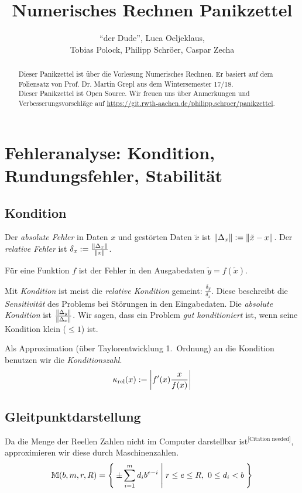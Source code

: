 \documentclass[a4paper,parskip=half*,DIV=15,fontsize=11pt]{scrartcl}
\title{Numerisches Rechnen Panikzettel}
\author{``der Dude'', Luca Oeljeklaus,\\ Tobias Polock, Philipp Schröer, Caspar Zecha}
\DeclarePairedDelimiter\abs{\lvert}{\rvert}
\DeclarePairedDelimiter\norm{\lVert}{\rVert}
\begin{document}
\maketitle

\begin{abstract}
Dieser Panikzettel ist über die Vorlesung Numerisches Rechnen. Er basiert auf dem Foliensatz von Prof. Dr. Martin Grepl aus dem Wintersemester 17/18.	\\
Dieser Panikzettel ist Open Source. Wir freuen uns über Anmerkungen und Verbesserungsvorschläge auf \url{https://git.rwth-aachen.de/philipp.schroer/panikzettel}.
\end{abstract}

\tableofcontents

\section{Fehleranalyse: Kondition, Rundungsfehler, Stabilität}

\subsection{Kondition}

Der \emph{absolute Fehler} in Daten $x$ und gestörten Daten $\tilde{x}$ ist $\norm{\Delta_x} := \norm{\tilde{x}-x}$.
Der \emph{relative Fehler} ist $\delta_x := \frac{\norm{\Delta_x}}{\norm{x}}$.

Für eine Funktion $f$ ist der Fehler in den Ausgabedaten $\tilde{y} = f(\tilde{x})$.

Mit \emph{Kondition} ist meist die \emph{relative Kondition} gemeint: $\frac{\delta_y}{\delta_x}$. Diese beschreibt die \emph{Sensitivität} des Problems bei Störungen in den Eingabedaten. Die \emph{absolute Kondition} ist $\frac{\norm{\Delta_y}}{\norm{\Delta_x}}$. Wir sagen, dass ein Problem \emph{gut konditioniert} ist, wenn seine Kondition klein ($\leq 1$) ist.

Als Approximation (über Taylorentwicklung 1.\ Ordnung) an die Kondition benutzen wir die \emph{Konditionszahl}.
\[\kappa_{\text{rel}}(x) := \abs*{f'(x)\frac{x}{f(x)}}\]

\subsection{Gleitpunktdarstellung}

Da die Menge der Reellen Zahlen nicht im Computer darstellbar ist${}^{\textrm{[Citation needed]}}$, approximieren wir diese durch Maschinenzahlen.
\[\mathbb{M}(b,m,r,R) = \Set{ \pm\sum_{i=1}^m d_{i}b^{e-i} | r \le e \le R,\ 0 \le d_i < b }\]
\end{document}
